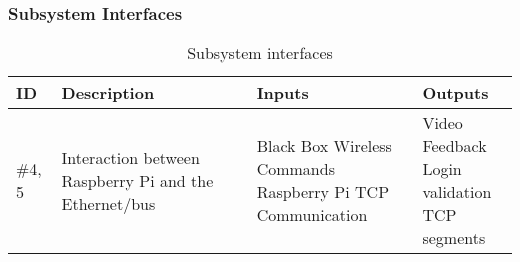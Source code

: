 \subsubsection{Subsystem Interfaces}

\begin {table}[H]
\caption {Subsystem interfaces} 
\begin{center}
    \begin{tabular}{ | p{1cm} | p{6cm} | p{3cm} | p{3cm} |}
    \hline
    ID & Description & Inputs & Outputs \\ \hline
    \#4, 5 & Interaction between Raspberry Pi and the Ethernet/bus & \pbox{3cm}{Black Box Wireless Commands \\ Raspberry Pi TCP Communication} & \pbox{3cm}{Video Feedback \\ Login validation \\ TCP segments}  \\ \hline
    \end{tabular}
\end{center}
\end{table}
